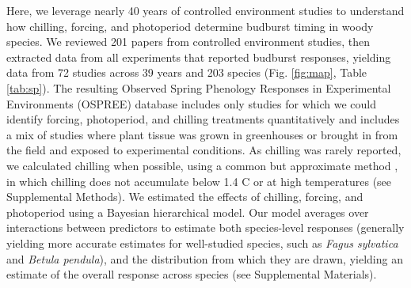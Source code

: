 \documentclass{article}
\begin{document}
\par Here, we leverage nearly 40 years of controlled environment studies to understand how chilling, forcing, and photoperiod determine budburst timing in woody species. %
We reviewed 201 papers from controlled environment studies, then extracted data from all experiments that reported budburst responses, yielding data from 72 studies across 39 years and 203 species (Fig. \ref{fig:map}, Table \ref{tab:sp}).%
The resulting Observed Spring Phenology Responses in Experimental Environments (OSPREE) database includes only studies for which we could identify forcing, photoperiod, and chilling treatments quantitatively and includes a mix of studies where plant tissue was grown in greenhouses or brought in from the field and exposed to experimental conditions. As chilling was rarely reported, we calculated chilling when possible, using a common but approximate method \citep{richardson1974}, in which chilling does not accumulate below 1.4 \degree C or at high temperatures (see Supplemental Methods). We estimated the effects of chilling, forcing, and photoperiod using a Bayesian hierarchical model. Our model averages over interactions between predictors to estimate both species-level responses (generally yielding more accurate estimates for well-studied species, such as \emph{Fagus sylvatica} and \emph{Betula pendula}), and the distribution from which they are drawn, yielding an estimate of the overall response across species (see Supplemental Materials).
\end{document}
